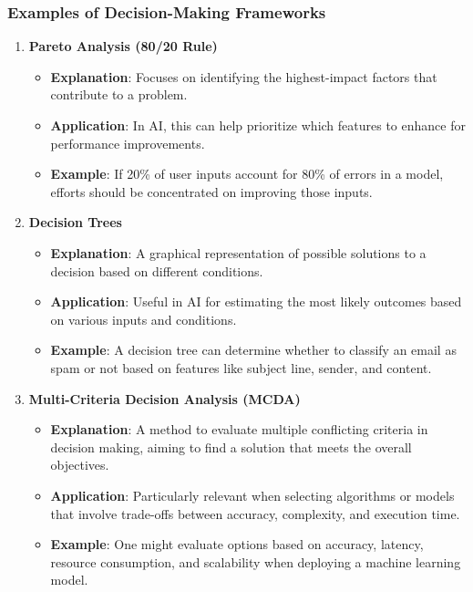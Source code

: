 \documentclass[aspectratio=169]{beamer}
\begin{document}
\begin{frame}[fragile]
    \frametitle{Examples of Decision-Making Frameworks}
    \begin{enumerate}
    
        \item \textbf{Pareto Analysis (80/20 Rule)}
        \begin{itemize}
            \item \textbf{Explanation}: Focuses on identifying the highest-impact factors that contribute to a problem.
            \item \textbf{Application}: In AI, this can help prioritize which features to enhance for performance improvements.
            \item \textbf{Example}: If 20\% of user inputs account for 80\% of errors in a model, efforts should be concentrated on improving those inputs.
        \end{itemize}

        \item \textbf{Decision Trees}
        \begin{itemize}
            \item \textbf{Explanation}: A graphical representation of possible solutions to a decision based on different conditions.
            \item \textbf{Application}: Useful in AI for estimating the most likely outcomes based on various inputs and conditions.
            \item \textbf{Example}: A decision tree can determine whether to classify an email as spam or not based on features like subject line, sender, and content.
        \end{itemize}

        \item \textbf{Multi-Criteria Decision Analysis (MCDA)}
        \begin{itemize}
            \item \textbf{Explanation}: A method to evaluate multiple conflicting criteria in decision making, aiming to find a solution that meets the overall objectives.
            \item \textbf{Application}: Particularly relevant when selecting algorithms or models that involve trade-offs between accuracy, complexity, and execution time.
            \item \textbf{Example}: One might evaluate options based on accuracy, latency, resource consumption, and scalability when deploying a machine learning model.
        \end{itemize}

    \end{enumerate}
\end{frame}
\end{document}
